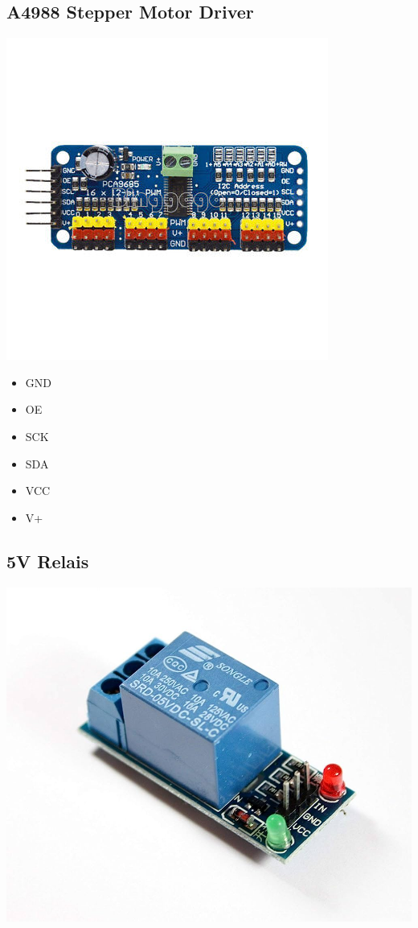 \documentclass[12pt,letterpaper]{article}
\begin{document}
	\subsection{A4988 Stepper Motor Driver}

	\begin{center}
	\includegraphics[scale=0.5]{pca9685}
	\end{center}
	
	\begin{itemize}
	\item GND
	\item OE
	\item SCK
	\item SDA
	\item VCC
	\item V+
	\end{itemize}

	\newpage	
	
	\subsection{5V Relais}

	\begin{center}
	\includegraphics[scale=0.2]{relais}
	\end{center}
	
\end{document}
